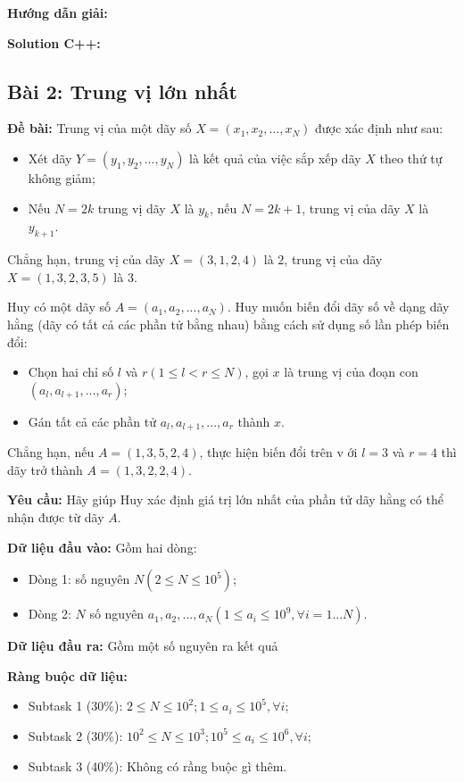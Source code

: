 \documentclass[12pt]{scrartcl}  %
\begin{document}
\textbf{Hướng dẫn giải:}

\textbf{Solution C++:}

\subsection{Bài 2: Trung vị lớn nhất}
\textbf{Đề bài:}
Trung vị của một dãy số $X = (x_1, x_2, ..., x_N)$ được xác định như sau:
\begin{itemize}
    \item Xét dãy $Y = (y_1, y_2, ..., y_N)$ là kết quả của việc sắp xếp dãy $X$ theo thứ tự không giảm;
    \item Nếu $N = 2k$ trung vị dãy $X$ là $y_k$, nếu $N = 2k + 1$, trung vị của dãy $X$ là $y_{k+1}$.
\end{itemize}
Chẳng hạn, trung vị của dãy $X = (3, 1, 2, 4)$ là $2$, trung vị của dãy $X = (1, 3, 2, 3, 5)$ là $3$.

Huy có một dãy số $A = (a_1, a_2, ..., a_N)$. Huy muốn biến đổi dãy số về dạng dãy hằng (dãy có tất cả các phần tử bằng nhau) bằng cách sử dụng số lần phép biến đổi:
\begin{itemize}
    \item Chọn hai chỉ số $l$ và $r (1 \leq l < r \leq N)$, gọi $x$ là trung vị của đoạn con $(a_l, a_{l + 1}, ..., a_r)$;
    \item Gán tất cả các phần tử $a_l, a_{l + 1}, ..., a_r$ thành $x$.
\end{itemize}

Chẳng hạn, nếu $A = (1, 3, 5, 2, 4)$, thực hiện biến đổi trên v ới $l = 3$ và $r = 4$ thì dãy trở thành $A = (1, 3, 2, 2, 4)$.

\textbf{Yêu cầu:}
Hãy giúp Huy xác định giá trị lớn nhất của phần tử dãy hằng có thể nhận được từ dãy $A$.

\textbf{Dữ liệu đầu vào:}
Gồm hai dòng:
\begin{itemize}
    \item Dòng 1: số nguyên $N (2 \leq N \leq 10^5)$;
    \item Dòng 2: $N$ số nguyên $a_1, a_2, ..., a_N (1 \leq a_i \leq 10^9, \forall i = 1 ... N)$.
\end{itemize}

\textbf{Dữ liệu đầu ra:}
Gồm một số nguyên ra kết quả 

\textbf{Ràng buộc dữ liệu:}
\begin{itemize}
    \item Subtask 1 (30\%): $2 \leq N \leq 10^2; 1 \leq a_i \leq 10^5, \forall i$;
    \item Subtask 2 (30\%): $10^2 \leq N \leq 10^3; 10^5 \leq a_i \leq 10^6, \forall i$;
    \item Subtask 3 (40\%): Không có rầng buộc gì thêm.
\end{itemize}
\end{document}
